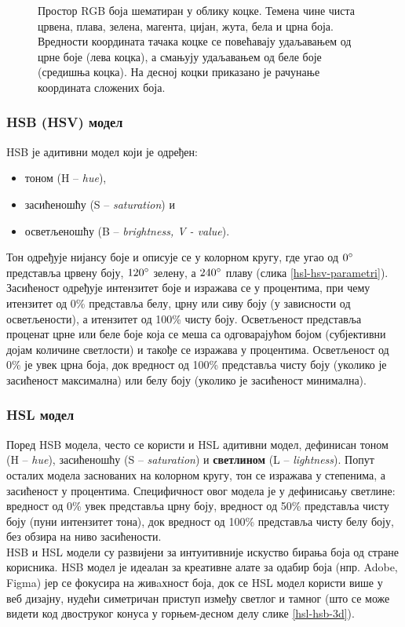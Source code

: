 \documentclass[A4, 11pt]{article}
\begin{document}
\begin{figure}
    \centering
    
    \caption{Простор RGB боја шематиран у облику коцке. Темена чине чиста црвена, плава, зелена, магента, цијан, жута, бела и црна боја. Вредности координата тачака коцке се повећавају удаљавањем од црне боје (лева коцка), а смањују удаљавањем од беле боје (средишња коцка). На десној коцки приказано је рачунање координата сложених боја.}
    \label{rgb-kocka}
\end{figure}

\subsubsection{HSB (HSV) модел}
\noindent HSB је адитивни модел који је одређен:
\begin{itemize}
\item тоном (H – \textit{hue}), 
\item засићеношћу (S – \textit{saturation}) и 
\item осветљеношћу (B – \textit{brightness, V - \textit{value}}).
\end{itemize} Тон одређује нијансу боје и описује се у колорном кругу, где угао од $0\degree$ представља црвену боју, $120\degree$ зелену, а $240\degree$ плаву (слика \ref{hsl-hsv-parametri}). Засићеност одређује интензитет боје и изражава се у процентима, при чему итензитет од 0\% представља белу, црну или сиву боју (у зависности од осветљености), а итензитет од 100\% чисту боју.
Осветљеност представља проценат црне или беле боје која се меша са одговарајућом бојом (субјективни дојам количине светлости) и такође се изражава у процентима. Осветљеност од 0\% је увек црна боја, док вредност од 100\% представља чисту боју (уколико је засићеност максимална) или белу боју (уколико је засићеност минимална).

\subsubsection{HSL модел}
\noindent Поред HSB модела, често се користи и HSL адитивни модел, дефинисан тоном (H –
\textit{hue}), засићеношћу (S – \textit{saturation}) и \textbf{светлином} (L – \textit{lightness}). Попут осталих модела заснованих на колорном кругу, тон се изражава у степенима, а засићеност у процентима. Специфичност овог модела је у дефинисању светлине:
вредност од 0\% увек представља црну боју, вредност од 50\% представља чисту боју (пуни интензитет
тона), док вредност од 100\% представља чисту белу боју, без обзира на ниво засићености. \\
HSB и HSL модели су развијени за интуитивније искуство бирања боја од стране корисника. HSB модел је идеалан за креативне алате за одабир боја (нпр. Adobe, Figma) јер се фокусира на живaхност боја, док се HSL модел користи више у веб дизајну, нудећи симетричан приступ између светлог и тамног (што се може видети код двоструког конуса у горњем-десном делу слике \ref{hsl-hsb-3d}).
\end{document}
